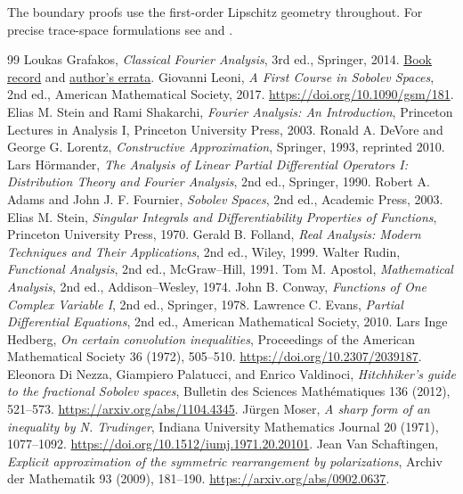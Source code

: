 \documentclass[11pt,oneside,openany]{book}
\theoremstyle{definition}
\theoremstyle{remark}
\begin{document}
The boundary proofs use the first-order Lipschitz geometry throughout.
For precise trace-space formulations see
\cite[Theorems 18.7, 18.18, 18.27--18.28, 18.34 and 18.40]{leoni}
and \cite[Chapters 5 and 7]{adams}.
\backmatter
\begin{thebibliography}{99}
 Loukas Grafakos, \emph{Classical Fourier Analysis}, 3rd ed., Springer, 2014. \href{https://doi.org/10.1007/978-1-4939-1194-3}{Book record} and \href{https://grafakos.missouri.edu/CFA.html}{author's errata}.
 Giovanni Leoni, \emph{A First Course in Sobolev Spaces}, 2nd ed., American Mathematical Society, 2017. \url{https://doi.org/10.1090/gsm/181}.
 Elias M. Stein and Rami Shakarchi, \emph{Fourier Analysis: An Introduction}, Princeton Lectures in Analysis I, Princeton University Press, 2003.
 Ronald A. DeVore and George G. Lorentz, \emph{Constructive Approximation}, Springer, 1993, reprinted 2010.
 Lars H\"ormander, \emph{The Analysis of Linear Partial Differential Operators I: Distribution Theory and Fourier Analysis}, 2nd ed., Springer, 1990.
 Robert A. Adams and John J. F. Fournier, \emph{Sobolev Spaces}, 2nd ed., Academic Press, 2003.
 Elias M. Stein, \emph{Singular Integrals and Differentiability Properties of Functions}, Princeton University Press, 1970.
 Gerald B. Folland, \emph{Real Analysis: Modern Techniques and Their Applications}, 2nd ed., Wiley, 1999.
 Walter Rudin, \emph{Functional Analysis}, 2nd ed., McGraw--Hill, 1991.
 Tom M. Apostol, \emph{Mathematical Analysis}, 2nd ed., Addison--Wesley, 1974.
 John B. Conway, \emph{Functions of One Complex Variable I}, 2nd ed., Springer, 1978.
 Lawrence C. Evans, \emph{Partial Differential Equations}, 2nd ed., American Mathematical Society, 2010.
 Lars Inge Hedberg, \emph{On certain convolution inequalities}, Proceedings of the American Mathematical Society 36 (1972), 505--510. \url{https://doi.org/10.2307/2039187}.
 Eleonora Di Nezza, Giampiero Palatucci, and Enrico Valdinoci, \emph{Hitchhiker's guide to the fractional Sobolev spaces}, Bulletin des Sciences Math\'ematiques 136 (2012), 521--573. \url{https://arxiv.org/abs/1104.4345}.
 J\"urgen Moser, \emph{A sharp form of an inequality by N. Trudinger}, Indiana University Mathematics Journal 20 (1971), 1077--1092. \url{https://doi.org/10.1512/iumj.1971.20.20101}.
 Jean Van Schaftingen, \emph{Explicit approximation of the symmetric rearrangement by polarizations}, Archiv der Mathematik 93 (2009), 181--190. \url{https://arxiv.org/abs/0902.0637}.

\end{thebibliography}
\end{document}
